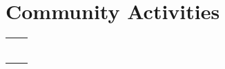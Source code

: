 \documentclass[a4paper, 10pt]{article}
\newcommand{\ExternalLink}{%
	\tikz[x=1.2ex, y=1.2ex, baseline=-0.05ex]{%
		\begin{scope}[x=1ex, y=1ex]
			\clip (-0.1,-0.1) 
			--++ (-0, 1.2) 
			--++ (0.6, 0) 
			--++ (0, -0.6) 
			--++ (0.6, 0) 
			--++ (0, -1);
			\path[draw, 
			line width = 0.5, 
			rounded corners=0.5] 
			(0,0) rectangle (1,1);
		\end{scope}
		\path[draw, line width = 0.5] (0.5, 0.5) 
		-- (1, 1);
		\path[draw, line width = 0.5] (0.6, 1) 
		-- (1, 1) -- (1, 0.6);
	}
}
\begin{document}
\begin{center}
\begin{table}[H]
\begin{adjustwidth}{-.6mm}{-0.5cm}
\begin{tabular}
\begin{comment}
			\multicolumn{2}{L{536pt}}{{{Chaired the meetup with Prof. Bryan Ford \textsuperscript{\href{https://bford.info/}{\ExternalLink}}, leader of  EPFL Decentralized/Distributed Systems lab \hfill {\space\faMapMarker} \small{Geneva}, 2017}}}\\
\end{comment}
			
		\end{tabular}
	\end{adjustwidth}
\end{table}

\vspace{-6ex}
\begin{minipage}[t]{0.48\textwidth}
	

	\vspace{-4ex}
	\section{Community Activities}
		\vspace{-4ex}
	\begin{tabularx}{1\linewidth}{>{\raggedleft\scshape}p{3cm}X}
			\multicolumn{2}{L{250pt}}{{{2015 - Present : Geneva Debate Club \textsuperscript{\href{https://www.clubdedebat.ch/}{\ExternalLink}}}}}\\
			\multicolumn{2}{L{250pt}}{{{2018 - Present : CERN Entrepreneurship Meetups \textsuperscript{\href{https://www.clubdedebat.ch/}{\ExternalLink}}}}}\\
			\multicolumn{2}{L{250pt}}{{{2016 - 2018 \hspace{12pt}: Swiss Cyber-Security meetup \textsuperscript{\href{https://swiss-cybersecurity.ch/}{\ExternalLink}}}}}\\ \\
			\multicolumn{2}{L{259pt}}{{{\uline {\fontfamily{\sfdefault}\fontsize{10pt}{10}\selectfont {Operating Systems:}} {Debian GNU/Linux, Windows, macOS} \hspace{2cm} \uline {} \textsuperscript{}}}}\\
			\multicolumn{2}{L{536pt}}{{{{\large\textbf{\uuline{\textbf{References}:}}} Prof. John Ellis \textsuperscript{\href{https://en.wikipedia.org/wiki/John_Ellis_(physicist)}{\ExternalLink}}, Dr. Markus Nordberg \textsuperscript{\href{https://nordberg.web.cern.ch/}{\ExternalLink}}, Dr. Fran\c{c}ois Grey \textsuperscript{\href{https://en.wikipedia.org/wiki/John_Ellis_(physicist)}{\ExternalLink}}, Dr. Ben Segal \textsuperscript{\href{https://internethalloffame.org/inductees/ben-segal}{\ExternalLink}}
			
}}}
\end{tabularx}
\end{minipage}
\end{center}
\end{document}
